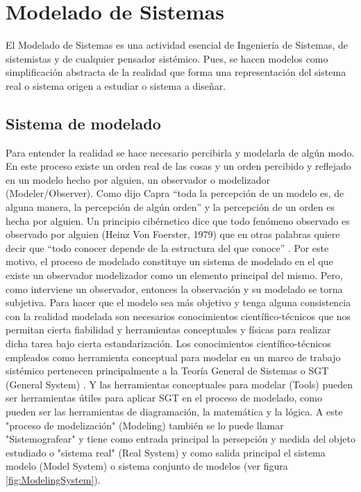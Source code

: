
\chapter{Modelado de Sistemas}

El Modelado de Sistemas es una actividad esencial de Ingeniería de Sistemas, de sistemistas y de cualquier pensador sistémico. Pues, se hacen modelos como simplificación abstracta de la realidad \cite{Meadows-2009} que forma una representación del sistema real \cite{Fiuba-2005} o sistema origen a estudiar o sistema a diseñar.

\section{Sistema de modelado}

Para entender la realidad se hace necesario percibirla y modelarla de algún modo. En este proceso existe un orden real de las cosas y un orden percibido y reflejado en un modelo hecho por alguien, un observador o modelizador (Modeler/Observer). Como dijo Capra “toda la percepción de un modelo es, de alguna manera, la percepción de algún orden” \cite{Fritjof-Capra-1975} y la percepción de un orden es hecha por alguien. Un principio cibérnetico dice que todo fenómeno observado es observado por alguien (Heinz Von Foerster, 1979) que en otras palabras quiere decir que “todo conocer depende de la estructura del que conoce” \cite{Maturana-1984}. Por este motivo, el proceso de modelado constituye un sistema de modelado en el que existe un observador modelizador como un elemento principal del mismo. Pero, como interviene un observador, entonces la observación y su modelado se torna subjetiva. Para hacer que el modelo sea más objetivo y tenga alguna consistencia con la realidad modelada son necesarios conocimientos científico-técnicos que nos permitan cierta fiabilidad y herramientas conceptuales y físicas para realizar dicha tarea bajo cierta estandarización. Los conocimientos científico-técnicos empleados como herramienta conceptual para modelar en un marco de trabajo sistémico pertenecen principalmente a la Teoría General de Sistemas o SGT (General System) \cite{Sarabia-1995}. Y las herramientas conceptuales para modelar (Tools) pueden ser herramientas útiles para aplicar SGT en el proceso de modelado, como pueden ser las herramientas de diagramación, la matemática y la lógica. A este "proceso de modelización" (Modeling) también se lo puede llamar "Sistemografear" \cite{Le-Moigne-1994} y tiene como entrada principal la persepción y medida del objeto estudiado o "sistema real" (Real System) y como salida principal el sistema modelo (Model System) o sistema conjunto de modelos (ver figura \ref{fig:ModelingSystem}).

